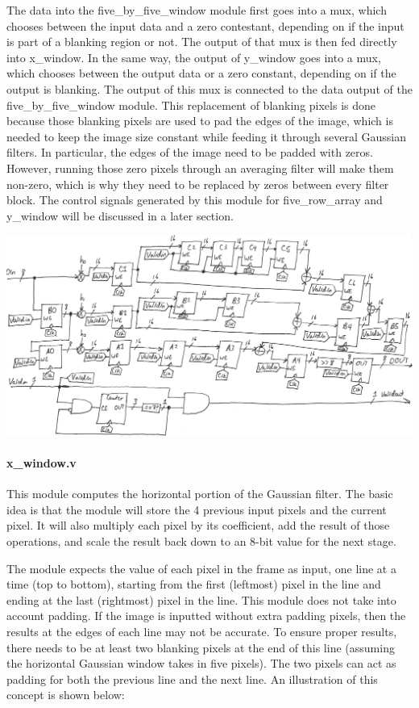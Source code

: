 \documentclass[12pt]{article}
\begin{document}
The data into the five\_by\_five\_window module first goes into a mux, which 
chooses between the input data and a zero contestant, depending on if the input 
is part of a blanking region or not. The output of that mux is then fed directly 
into x\_window. In the same way, the output of y\_window goes into a mux, which 
chooses between the output data or a zero constant, depending on if the output 
is blanking. The output of this mux is connected to the data output of the 
five\_by\_five\_window module. This replacement of blanking pixels is done because 
those blanking pixels are used to pad the edges of the image, which is needed to 
keep the image size constant while feeding it through several Gaussian filters. 
In particular, the edges of the image need to be padded with zeros. However, 
running those zero pixels through an averaging filter will make them non-zero, 
which is why they need to be replaced by zeros between every filter block.
The control signals generated by this module for five\_row\_array and y\_window 
will be discussed in a later section.

\includegraphics[width=\textwidth]{processed_image_pngs/x_window.png}

\paragraph{x\_window.v}

This module computes the horizontal portion of the Gaussian filter. The basic 
idea is that the module will store the 4 previous input pixels and the current 
pixel. It will also multiply each pixel by its coefficient, add the result of 
those operations, and scale the result back down to an 8-bit value for the next 
stage.

The module expects the value of each pixel in the frame as input, one line at 
a time (top to bottom), starting from the first (leftmost) pixel in the line and 
ending at the last (rightmost) pixel in the line. This module does not take into 
account padding. If the image is inputted without extra padding pixels, then the 
results at the edges of each line may not be accurate. To ensure proper results, 
there needs to be at least two blanking pixels at the end of this line (assuming 
the horizontal Gaussian window takes in five pixels). The two pixels can act as 
padding for both the previous line and the next line. An illustration of this 
concept is shown below:
\end{document}
